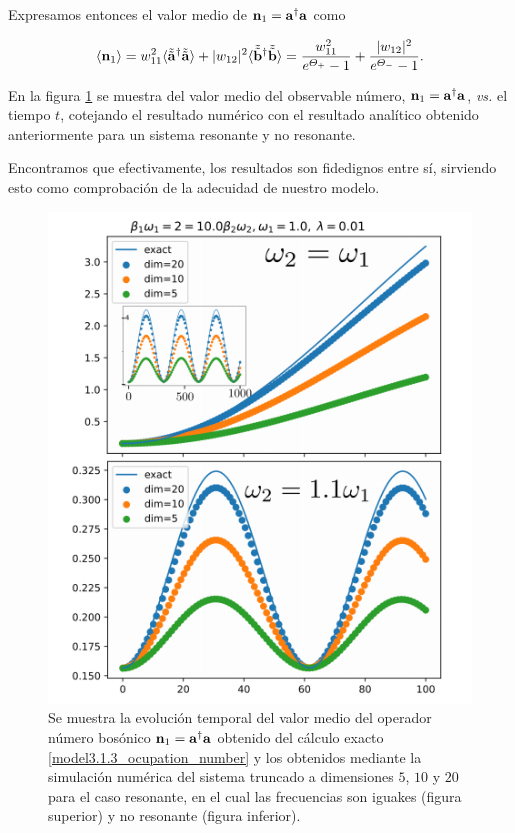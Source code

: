 \documentclass{report} %
\numberwithin{equation}{section}
\begin{document}
Expresamos entonces el valor medio de ${\bf n}_1={\mathbf a}^\dagger{\mathbf a}$ como

\begin{equation}
\langle{\bf n}_1\rangle= w_{11}^2 \langle \tilde{\tilde{\mathbf a}}^\dagger \tilde{\tilde{\mathbf a}}\rangle + |w_{12}|^2
\langle \tilde{\tilde{\mathbf b}}^\dagger \tilde{\tilde{\mathbf b}}\rangle=
\frac{w_{11}^2 }{e^{\Theta_+}-1} +  \frac{|w_{12}|^2 }{e^{\Theta_-}-1}.
\label{model3.1.3_ocupation_number}
\end{equation}

En la figura \ref{model3.1.3_fig1} se muestra del valor medio del observable número, ${\bf n}_1={\mathbf a}^\dagger{\mathbf a}$, \textit{vs.} el tiempo $t$, cotejando el resultado numérico con el resultado analítico obtenido anteriormente para un sistema resonante y no resonante.

\noindent Encontramos que efectivamente, los resultados son fidedignos entre sí, sirviendo esto como comprobación de la adecuidad de nuestro modelo. 

\begin{figure}
  \centering
  \includegraphics[scale=1]{figs/model3.1.3_fig1.png}
  \caption{Se muestra la evolución temporal del valor medio del operador número bosónico  ${\bf n}_1={\mathbf a}^\dagger{\mathbf a}$ obtenido del cálculo exacto \eqref{model3.1.3_ocupation_number} y los obtenidos mediante la simulación
  numérica del sistema truncado a dimensiones $5$, $10$ y $20$ para el caso resonante, en el cual las frecuencias son iguakes (figura superior) y no resonante (figura inferior). }
  \label{model3.1.3_fig1}
\end{figure}
\end{document}
